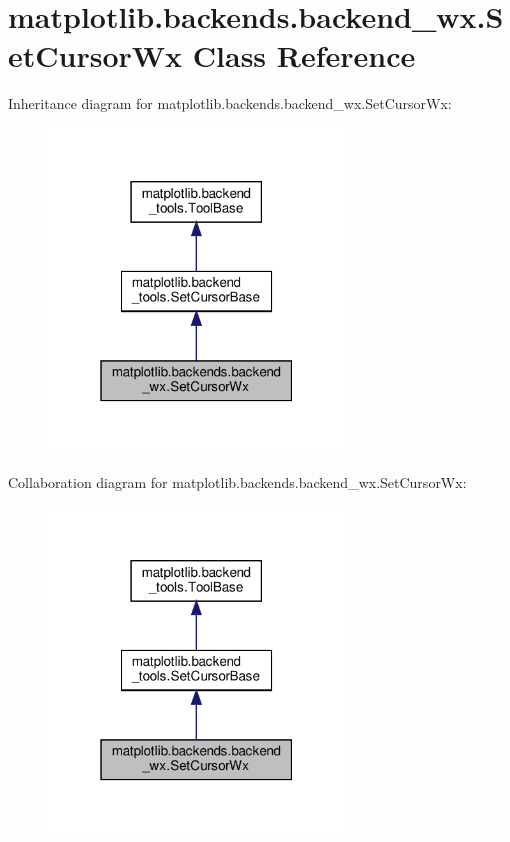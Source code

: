 \hypertarget{classmatplotlib_1_1backends_1_1backend__wx_1_1SetCursorWx}{}\section{matplotlib.\+backends.\+backend\+\_\+wx.\+Set\+Cursor\+Wx Class Reference}
\label{classmatplotlib_1_1backends_1_1backend__wx_1_1SetCursorWx}


Inheritance diagram for matplotlib.\+backends.\+backend\+\_\+wx.\+Set\+Cursor\+Wx\+:
\nopagebreak
\begin{figure}[H]
\begin{center}
\leavevmode
\includegraphics[width=223pt]{classmatplotlib_1_1backends_1_1backend__wx_1_1SetCursorWx__inherit__graph}
\end{center}
\end{figure}


Collaboration diagram for matplotlib.\+backends.\+backend\+\_\+wx.\+Set\+Cursor\+Wx\+:
\nopagebreak
\begin{figure}[H]
\begin{center}
\leavevmode
\includegraphics[width=223pt]{classmatplotlib_1_1backends_1_1backend__wx_1_1SetCursorWx__coll__graph}
\end{center}
\end{figure}
